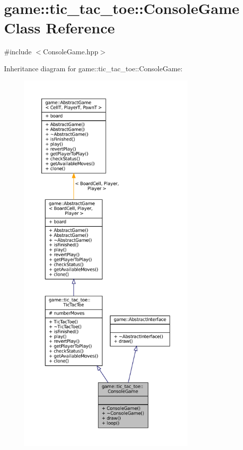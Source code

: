 \hypertarget{classgame_1_1tic__tac__toe_1_1_console_game}{}\section{game\+:\+:tic\+\_\+tac\+\_\+toe\+:\+:Console\+Game Class Reference}
\label{classgame_1_1tic__tac__toe_1_1_console_game}


{\ttfamily \#include $<$Console\+Game.\+hpp$>$}



Inheritance diagram for game\+:\+:tic\+\_\+tac\+\_\+toe\+:\+:Console\+Game\+:
\nopagebreak
\begin{figure}[H]
\begin{center}
\leavevmode
\includegraphics[height=550pt]{classgame_1_1tic__tac__toe_1_1_console_game__inherit__graph}
\end{center}
\end{figure}


